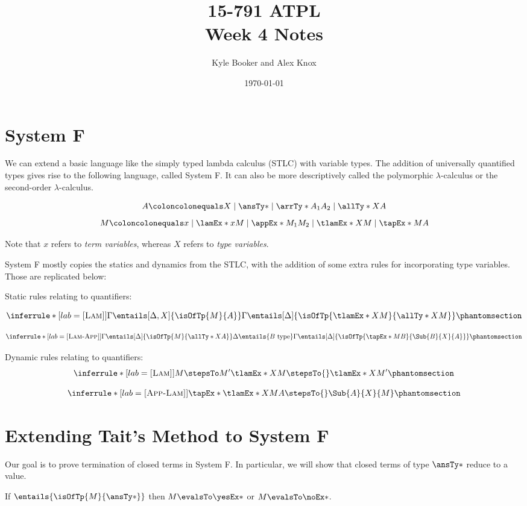 \documentclass[letterpaper]{article}
\title{15-791 ATPL \\ Week 4 Notes}
\author{Kyle Booker and Alex Knox}
\date{\today}
\begin{document}
\maketitle

\section{System F}

We can extend a basic language like the simply typed lambda calculus (STLC) with variable types. The addition of universally quantified types gives rise to the following language, called System F. It can also be more descriptively called the polymorphic $\lambda$-calculus or the second-order $\lambda$-calculus.

$$
A \coloncolonequals X \mid \ansTy* \mid \arrTy*{A_1}{A_2} \mid \allTy*{X}{A}
$$
$$
M \coloncolonequals x \mid \lamEx*{x}{M} \mid \appEx*{M_1}{M_2} \mid \tlamEx*{X}{M} \mid \tapEx*{M}{A}
$$

Note that $x$ refers to \textit{term variables}, whereas $X$ refers to \textit{type variables}.

System F mostly copies the statics and dynamics from the STLC, with the addition of some extra rules for incorporating type variables. Those are replicated below:

Static rules relating to quantifiers:

$$
\defrule[Lam][sta:lam]
  {\Gamma \entails[\Delta, X]{\isOfTp{M}{A}}}
  {\Gamma \entails[\Delta]{\isOfTp{\tlamEx*{X}{M}}{\allTy*{X}{M}}}}
$$

$$
\defrule[Lam-App][sta:app]
  {\Gamma \entails[\Delta]{\isOfTp{M}{\allTy*{X}{A}}} \\
   \Delta \entails{B \text{ type}}}
  {\Gamma \entails[\Delta]{\isOfTp{\tapEx*{M}{B}}{\Sub{B}{X}{A}}}}
$$

Dynamic rules relating to quantifiers:
$$
\defrule[Lam][dyn:lam]
  {M \stepsTo M'}
  {\tlamEx*{X}{M} \stepsTo{} \tlamEx*{X}{M'}}
$$

$$
\defrule[App-Lam][dyn:app]
  {\strut}
  {\tapEx*{\tlamEx*{X}{M}}{A} \stepsTo{} \Sub{A}{X}{M}}
$$

\section{Extending Tait's Method to System F}

Our goal is to prove termination of closed terms in System F. In particular, we will show that closed terms of type $\ansTy*$ reduce to a value.
\begin{theorem}
If $\entails{\isOfTp{M}{\ansTy*}}$ then $M \evalsTo \yesEx*$ or $M \evalsTo \noEx*$.
\end{theorem}
\end{document}
